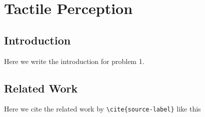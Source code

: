 \chapter{Tactile Perception} \label{ch:1-tactile-perception}

\section{Introduction} \label{sec:1-tactile-perception-introduction}
Here we write the introduction for problem 1.


\section{Related Work} \label{sec:1-tactile-perception-related-work}

Here we cite the related work by \texttt{\textbackslash cite\{source-label\}} like this \cite{recent-progress-in-technologies-for-tactile-sensors}